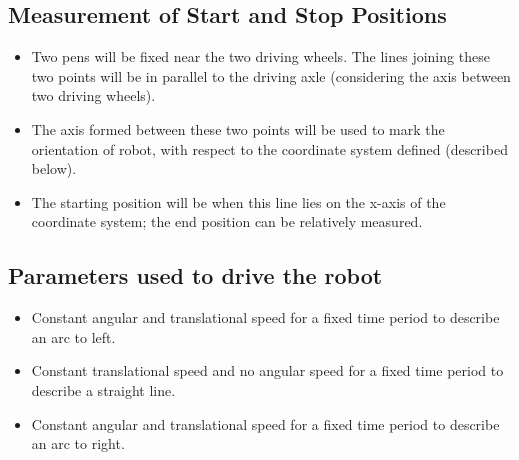 \documentclass[10pt,a4paper]{article}
\begin{document}
	\subsection{Measurement of Start and Stop Positions}
		\begin{itemize}
			\item Two pens will be fixed near the two driving wheels. The lines joining these two points will be in parallel to the driving axle (considering the axis between two driving wheels).
			\item The axis formed between these two points will be used to mark the orientation of robot, with respect to the coordinate system defined (described below).
			\item The starting position will be when this line lies on the x-axis of the coordinate system; the end position can be relatively measured.
		\end{itemize}
	\subsection{Parameters used to drive the robot}
		\begin{itemize}
			\item Constant angular and translational speed for a fixed time period to describe an arc to left.
			\item Constant translational speed and no angular speed for a fixed time period to describe a straight line.
			\item Constant angular and translational speed for a fixed time period to describe an arc to right.
		\end{itemize}
\end{document}
